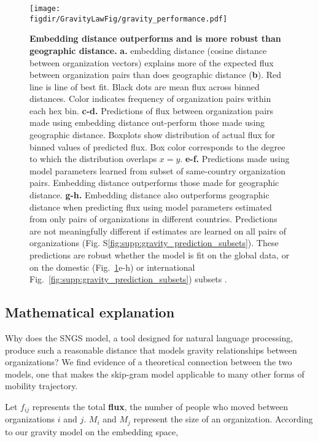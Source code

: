 \documentclass[12pt]{article} %
\def\figdir{../Figs}
\begin{document}
%
%
\begin{figure}[h!]
	\centering
	\texttt{[image: \\figdir/GravityLawFig/gravity\_performance.pdf]}
	\caption{
		\textbf{Embedding distance outperforms and is more robust than geographic distance.}
		\textbf{a.} embedding distance (cosine distance between organization vectors) explains more of the expected flux between organization pairs than does geographic distance (\textbf{b}). 
		Red line is line of best fit. 
		Black dots are mean flux across binned distances.
		Color indicates frequency of organization pairs within each hex bin.
		\textbf{c-d.} Predictions  of flux between organization pairs made using embedding distance out-perform those made using geographic distance. 
		Boxplots show distribution of actual flux for binned values of predicted flux.
		Box color corresponds to the degree to which the distribution overlaps $x = y$.
		\textbf{e-f.} Predictions made using model parameters learned from subset of same-country organization pairs. 
		Embedding distance outperforms those made for geographic distance.
		\textbf{g-h.} Embedding distance also outperforms geographic distance when predicting flux using model parameters estimated from only pairs of organizations in different countries. 
		Predictions are not meaningfully different if estimates are learned on all pairs of organizations (Fig. S\ref{fig:supp:gravity_prediction_subsets}).
		These predictions are robust whether the model is fit on the global data, or on the domestic (Fig.~\ref{fig:gravity_performance}e-h) or international Fig.~\ref{fig:supp:gravity_prediction_subsets}) subsets .
	}
	\label{fig:gravity_performance}
\end{figure}


%
%
\subsection*{Mathematical explanation}

Why does the SNGS model, a tool designed for natural language processing, produce such a reasonable distance that models gravity relationships between organizations?
We find evidence of a theoretical connection between the two models, one that makes the skip-gram model applicable to many other forms of mobility trajectory. 

Let $f_{ij}$ represents the total \textbf{flux}, the number of people who moved between organizations $i$ and $j$. $M_{i}$ and $M_{j}$ represent the size of an organization. According to our gravity model on the embedding space,
\end{document}

